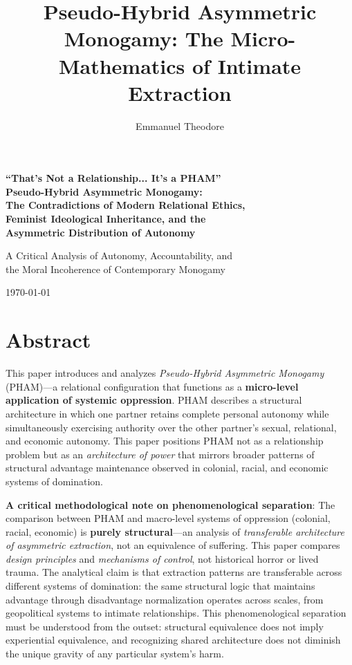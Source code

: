 \documentclass[12pt,openany]{book}
\title{Pseudo-Hybrid Asymmetric Monogamy: The Micro-Mathematics of Intimate Extraction}
\author{Emmanuel Theodore}
\date{}
\numberwithin{equation}{chapter}
\begin{document}
\frontmatter

\begin{titlepage}
    \centering
    \vspace*{2in}
    {\LARGE\bfseries ``That's Not a Relationship... It's a PHAM''\\[0.5em]
    \large Pseudo-Hybrid Asymmetric Monogamy:\\[0.3em]
    The Contradictions of Modern Relational Ethics,\\[0.3em]
    Feminist Ideological Inheritance, and the\\[0.3em]
    Asymmetric Distribution of Autonomy\par}
    \vspace{1.5in}
    {\Large A Critical Analysis of Autonomy, Accountability, and\\[0.3em]
    the Moral Incoherence of Contemporary Monogamy\par}
    \vspace{2in}
    {\large\today\par}
    \vfill
\end{titlepage}

\newpage
\chapter*{Abstract}

This paper introduces and analyzes \textit{Pseudo-Hybrid Asymmetric Monogamy} (PHAM)---a relational configuration that functions as a \textbf{micro-level application of systemic oppression}. PHAM describes a structural architecture in which one partner retains complete personal autonomy while simultaneously exercising authority over the other partner's sexual, relational, and economic autonomy. This paper positions PHAM not as a relationship problem but as an \textit{architecture of power} that mirrors broader patterns of structural advantage maintenance observed in colonial, racial, and economic systems of domination.

\textbf{A critical methodological note on phenomenological separation}: The comparison between PHAM and macro-level systems of oppression (colonial, racial, economic) is \textbf{purely structural}---an analysis of \textit{transferable architecture of asymmetric extraction}, not an equivalence of suffering. This paper compares \textit{design principles} and \textit{mechanisms of control}, not historical horror or lived trauma. The analytical claim is that extraction patterns are transferable across different systems of domination: the same structural logic that maintains advantage through disadvantage normalization operates across scales, from geopolitical systems to intimate relationships. This phenomenological separation must be understood from the outset: structural equivalence does not imply experiential equivalence, and recognizing shared architecture does not diminish the unique gravity of any particular system's harm.
\end{document}

